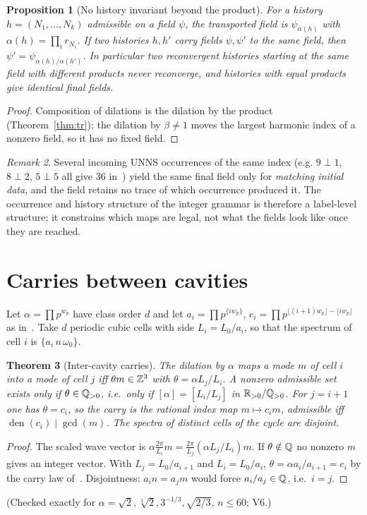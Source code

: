 \documentclass[11pt,a4paper]{article}
\newtheorem{theorem}{Theorem}[section]
\newtheorem{proposition}[theorem]{Proposition}
\theoremstyle{definition}
\theoremstyle{remark}
\newtheorem{remark}[theorem]{Remark}
\DeclareMathOperator{\den}{den}
\begin{document}
\begin{proposition}[No history invariant beyond the product]\label{prop:hist}
For a history $h=(N_1,\dots,N_k)$ admissible on a field $\psi$, the transported field is $\psi_{\alpha(h)}$ with $\alpha(h)=\prod_ir_{N_i}$. If two histories $h,h'$ carry fields $\psi,\psi'$ to the same field, then $\psi'=\psi_{\alpha(h)/\alpha(h')}$. In particular two reconvergent histories starting at the same field with different products never reconverge, and histories with equal products give identical final fields.
\end{proposition}
\begin{proof}
Composition of dilations is the dilation by the product (Theorem~\ref{thm:tr}); the dilation by $\beta\ne1$ moves the largest harmonic index of a nonzero field, so it has no fixed field.
\end{proof}
\begin{remark}
Several incoming UNNS occurrences of the same index (e.g. $9\perp1$, $8\perp2$, $5\perp5$ all give $36$ in~\cite{MX}) yield the same final field only for \emph{matching initial data}, and the field retains no trace of which occurrence produced it. The occurrence and history structure of the integer grammar is therefore a label-level structure; it constrains which maps are legal, not what the fields look like once they are reached.
\end{remark}

\section{Carries between cavities}\label{sec:cav}
Let $\alpha=\prod p^{w_p}$ have class order $d$ and let $a_i=\prod p^{\{iw_p\}}$, $c_i=\prod p^{\lfloor(i+1)w_p\rfloor-\lfloor iw_p\rfloor}$ as in~\cite{TC}. Take $d$ periodic cubic cells with side $L_i=L_0/a_i$, so that the spectrum of cell $i$ is $\{a_i\,n\,\omega_0\}$.

\begin{theorem}[Inter-cavity carries]\label{thm:cav}
The dilation by $\alpha$ maps a mode $m$ of cell $i$ into a mode of cell $j$ iff $\theta m\in\mathbb Z^3$ with $\theta=\alpha L_j/L_i$. A nonzero admissible set exists only if $\theta\in\mathbb Q_{>0}$, i.e.\ only if $[\alpha]=[L_i/L_j]$ in $\mathbb R_{>0}/\mathbb Q_{>0}$. For $j=i+1$ one has $\theta=c_i$, so the carry is the rational index map $m\mapsto c_im$, admissible iff $\den(c_i)\mid\gcd(m)$. The spectra of distinct cells of the cycle are disjoint.
\end{theorem}
\begin{proof}
The scaled wave vector is $\alpha\tfrac{2\pi}{L_i}m=\tfrac{2\pi}{L_j}(\alpha L_j/L_i)m$. If $\theta\notin\mathbb Q$ no nonzero $m$ gives an integer vector. With $L_j=L_0/a_{i+1}$ and $L_i=L_0/a_i$, $\theta=\alpha a_i/a_{i+1}=c_i$ by the carry law of~\cite{TC}. Disjointness: $a_in=a_jm$ would force $a_i/a_j\in\mathbb Q$, i.e.\ $i=j$.
\end{proof}
(Checked exactly for $\alpha=\sqrt2,\sqrt[3]2,3^{-1/3},\sqrt{2/3}$, $n\le60$; V6.)
\end{document}
